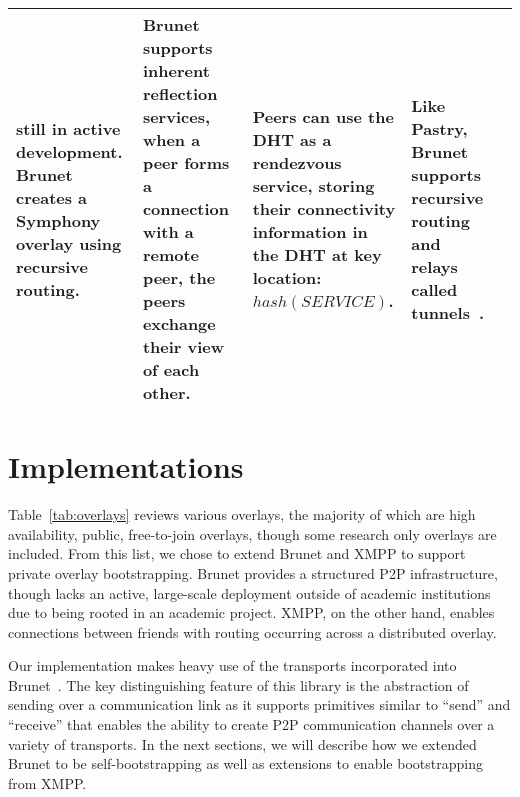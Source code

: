\documentclass[conference]{IEEEtran}
\begin{document}
\begin{table*}[h!t!]
\begin{tabular}[c]{|m{1.5cm}||m{5.5cm}|m{3cm}|m{3cm}|m{3cm}|}
still in active development.  Brunet creates a Symphony~\cite{symphony} overlay
using recursive routing.
&
Brunet supports inherent reflection services, when a peer forms a connection
with a remote peer, the peers exchange their view of each other.
&
Peers can use the DHT as a rendezvous service, storing their connectivity
information in the DHT at key location:  $hash(SERVICE)$.
&
Like Pastry, Brunet supports recursive routing and relays called
tunnels~\cite{hpdc08_0}.
\\ \hline
\end{tabular}
\caption{Public and Research Overlays}
\label{tab:overlays}
\end{table*}

\section{Implementations}
\label{implementation}

Table~\ref{tab:overlays} reviews various overlays, the majority of which are
high availability, public, free-to-join overlays, though some research only
overlays are included.  From this list, we chose to extend Brunet and XMPP
to support private overlay bootstrapping.  Brunet provides a structured P2P
infrastructure, though lacks an active, large-scale deployment outside of
academic institutions due to being rooted in an academic project.  XMPP, on the
other hand, enables connections between friends with routing occurring across a
distributed overlay.

Our implementation makes heavy use of the transports incorporated into
Brunet~\cite{brunet}.  The key distinguishing feature of this library is the
abstraction of sending over a communication link as it supports primitives
similar to ``send'' and ``receive'' that enables the ability to create P2P
communication channels over a variety of transports.  In the next sections, we
will describe how we extended Brunet to be self-bootstrapping as well as
extensions to enable bootstrapping from XMPP.
\end{document}
